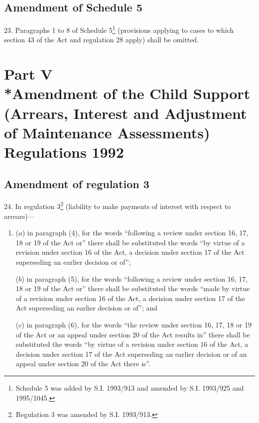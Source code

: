 \documentclass[12pt,a4paper]{article}
\begin{document}
\subsection[23. Amendment of Schedule 5]{Amendment of Schedule 5}

23.  Paragraphs 1 to 8 of Schedule 5\footnote{\frenchspacing Schedule 5 was added by S.I. 1993/913 and amended by S.I. 1993/925 and 1995/1045.} (provisions applying to cases to which section 43 of the Act and regulation 28 apply) shall be omitted.

\section[Part V --- Amendment of the Child Support (Arrears, Interest and Adjustment of Maintenance Assessments) Regulations 1992]{Part V\\*Amendment of the Child Support (Arrears, Interest and Adjustment of Maintenance Assessments) Regulations 1992}

\renewcommand\parthead{--- Part V}

\subsection[24. Amendment of regulation 3]{Amendment of regulation 3}

24.  In regulation 3\footnote{\frenchspacing Regulation 3 was amended by S.I. 1993/913.} (liability to make payments of interest with respect to arrears)—
\begin{enumerate}\item[]
($a$) in paragraph (4), for the words “following a review under section 16, 17, 18 or 19 of the Act or” there shall be substituted the words “by virtue of a revision under section 16 of the Act, a decision under section 17 of the Act superseding an earlier decision or of”;

($b$) in paragraph (5), for the words “following a review under section 16, 17, 18 or 19 of the Act or” there shall be substituted the words “made by virtue of a revision under section 16 of the Act, a decision under section 17 of the Act superseding an earlier decision or of”; and

($c$) in paragraph (6), for the words “the review under section 16, 17, 18 or 19 of the Act or an appeal under section 20 of the Act results in” there shall be substituted the words “by virtue of a revision under section 16 of the Act, a decision under section 17 of the Act superseding an earlier decision or of an appeal under section 20 of the Act there is”.
\end{enumerate}
\end{document}
